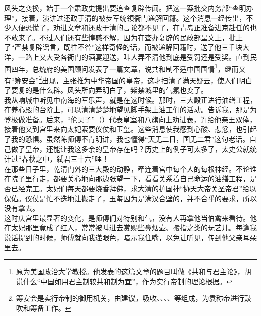 风头之变换，始于一个肃政史提出要追查复辟传闻。把这一案批交内务部“查明办理”，接着，演讲过还政于清的被步军统领衙门递解回籍。这个消息一经传出，不少人便恐慌了，劝进文章和还政于清的言论都不见了，在青岛正准备进京赴任的也不敢来了。不过人们还有些惶惑不解，因为在查办复辟的民政部呈文上，批上了“严禁复辟谣言，既往不咎”这样奇怪的话，而被递解回籍时，送了他三千块大洋，一路上又大受各衙门的酒宴迎送，叫人弄不清他到底是受罚还是受奖。直到民国四年，总统府的美国顾问发表了一篇文章，说共和制不适中国国情\footnote{原为美国政治大学教授。他发表的这篇文章的题目叫做《共和与君主论》，胡说什么“中国如用君主制较共和制为宜”，作为实行帝制的理论根据。}，继而又有“筹安会”\footnote{筹安会是实行帝制的御用机关，由建议，吸收、、、、等组成，为袁称帝进行鼓吹和筹备工作。}出现，主张推为中华帝国的皇帝，这才扫清了满天疑云，使人们明白了要复的是什么辟。风头所向弄明白了，紫禁城里的气氛也变了。\\

我从响城中听见中南海的军乐声，就是在这时候。那时，三大殿正进行油缮工程，在养心殿的台阶上，可以清清楚楚地望见脚手架上油工们的活动。告诉我，那是为登极做准备。后来，“伦贝子”（）代表皇室和八旗向上劝进表，许给他亲王双俸，接着他又到宫里来向太妃索要仪仗和玉玺。这些消息使我感到心酸、悲忿，也引起了我的恐惧。虽然陈师傅不肯明讲，我也懂得“天无二日，国无二君”这句老话。自己做了皇帝，还能让我这多余的皇帝存在吗？历史上的例子可太多了，太史公就统计过“春秋之中，弑君三十六”哩！\\

在那些日子里，乾清门外的三大殿的动静，牵连着宫中每个人的每根神经。不论谁在院子里行走，都要关心地向那边张望一下，看看关系着自己命运的油缮工程，是否已经完工。太妃们每天都要烧香拜佛，求大清的护国神“协天大帝关圣帝君”给以保佑。仪仗是忙不迭地让搬走了，玉玺因为是满汉合壁的，并不合乎的要求，所以没有拿去。\\

这时庆宫里最显著的变化，是师傅们对特别和气，没有人再拿他当伯禽来看待。他在太妃那里竟成了红人，常常被叫进去赏赐些鼻烟壶、搬指之类的玩艺儿。每逢我说话提到的时候，师傅就向我递眼色，暗示我住嘴，以免让听见，传到他父亲耳朵里去。\\

